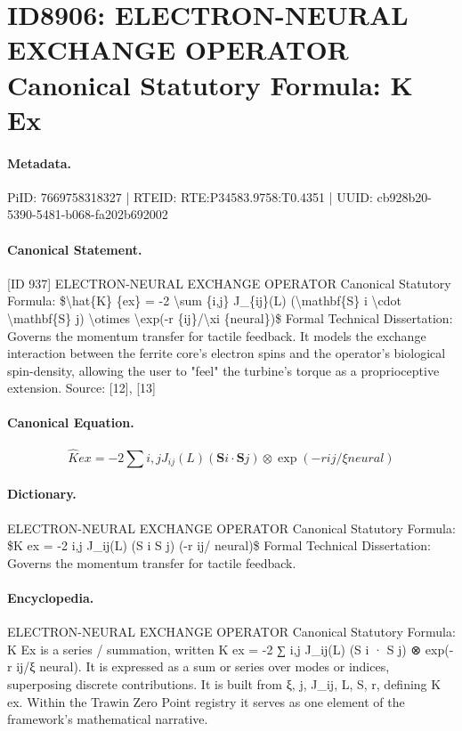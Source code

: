 \section*{ID8906: ELECTRON-NEURAL EXCHANGE OPERATOR Canonical Statutory Formula: K Ex}
\paragraph{Metadata.}
PiID: 7669758318327 | RTEID: RTE:P34583.9758:T0.4351 | UUID: cb928b20-5390-5481-b068-fa202b692002

\paragraph{Canonical Statement.}
[ID 937] ELECTRON-NEURAL EXCHANGE OPERATOR Canonical Statutory Formula: \$\textbackslash{}hat\{K\} \{ex\} = -2 \textbackslash{}sum \{i,j\} J\_\{ij\}(L) (\textbackslash{}mathbf\{S\} i \textbackslash{}cdot \textbackslash{}mathbf\{S\} j) \textbackslash{}otimes \textbackslash{}exp(-r \{ij\}/\textbackslash{}xi \{neural\})\$ Formal Technical Dissertation: Governs the momentum transfer for tactile feedback. It models the exchange interaction between the ferrite core's electron spins and the operator's biological spin-density, allowing the user to "feel" the turbine's torque as a proprioceptive extension. Source: [12], [13]

\paragraph{Canonical Equation.}
\[
\hat{K} {ex} = -2 \sum {i,j} J_{ij}(L) (\mathbf{S} i \cdot \mathbf{S} j) \otimes \exp(-r {ij}/\xi {neural})
\]

\paragraph{Dictionary.}
ELECTRON-NEURAL EXCHANGE OPERATOR Canonical Statutory Formula: \$K ex = -2 i,j J\_ij(L) (S i S j) (-r ij/ neural)\$ Formal Technical Dissertation: Governs the momentum transfer for tactile feedback.

\paragraph{Encyclopedia.}
ELECTRON-NEURAL EXCHANGE OPERATOR Canonical Statutory Formula: K Ex is a series / summation, written K ex = -2 ∑ i,j J\_ij(L) (S i · S j) ⊗ exp(-r ij/ξ neural). It is expressed as a sum or series over modes or indices, superposing discrete contributions. It is built from ξ, j, J\_ij, L, S, r, defining K ex. Within the Trawin Zero Point registry it serves as one element of the framework's mathematical narrative.

